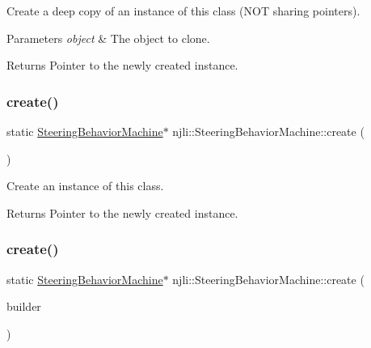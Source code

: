 Create a deep copy of an instance of this class (N\+OT sharing pointers).


\begin{DoxyParams}{Parameters}
{\em object} & The object to clone.\\
\hline
\end{DoxyParams}
\begin{DoxyReturn}{Returns}
Pointer to the newly created instance. 
\end{DoxyReturn}
\mbox{\label{classnjli_1_1_steering_behavior_machine_ab8fe4150d2324d83d50a413d35d16ae2}} 
\subsubsection{\texorpdfstring{create()}{create()}\hspace{0.1cm}{\footnotesize\ttfamily [1/2]}}
{\footnotesize\ttfamily static \mbox{\hyperlink{classnjli_1_1_steering_behavior_machine}{Steering\+Behavior\+Machine}}$\ast$ njli\+::\+Steering\+Behavior\+Machine\+::create (\begin{DoxyParamCaption}{ }\end{DoxyParamCaption})\hspace{0.3cm}{\ttfamily [static]}}

Create an instance of this class.

\begin{DoxyReturn}{Returns}
Pointer to the newly created instance. 
\end{DoxyReturn}
\mbox{\label{classnjli_1_1_steering_behavior_machine_a8c449bcdcb6b82b7258ad5e418d6c430}} 
\subsubsection{\texorpdfstring{create()}{create()}\hspace{0.1cm}{\footnotesize\ttfamily [2/2]}}
{\footnotesize\ttfamily static \mbox{\hyperlink{classnjli_1_1_steering_behavior_machine}{Steering\+Behavior\+Machine}}$\ast$ njli\+::\+Steering\+Behavior\+Machine\+::create (\begin{DoxyParamCaption}\item[{const \mbox{\hyperlink{classnjli_1_1_steering_behavior_machine_builder}{Steering\+Behavior\+Machine\+Builder}} \&}]{builder }\end{DoxyParamCaption})\hspace{0.3cm}{\ttfamily [static]}}

